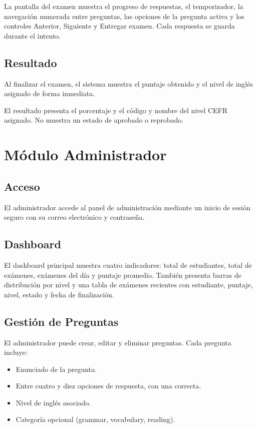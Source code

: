 La pantalla del examen muestra el progreso de respuestas, el temporizador, la navegación numerada entre preguntas, las opciones de la pregunta activa y los controles Anterior, Siguiente y Entregar examen. Cada respuesta se guarda durante el intento.

\subsection{Resultado}

Al finalizar el examen, el sistema muestra el puntaje obtenido y el nivel de inglés asignado de forma inmediata.

El resultado presenta el porcentaje y el código y nombre del nivel CEFR asignado. No muestra un estado de aprobado o reprobado.

\section{Módulo Administrador}

\subsection{Acceso}

El administrador accede al panel de administración mediante un inicio de sesión seguro con su correo electrónico y contraseña.

\subsection{Dashboard}

El dashboard principal muestra cuatro indicadores: total de estudiantes, total de exámenes, exámenes del día y puntaje promedio. También presenta barras de distribución por nivel y una tabla de exámenes recientes con estudiante, puntaje, nivel, estado y fecha de finalización.

\subsection{Gestión de Preguntas}

El administrador puede crear, editar y eliminar preguntas. Cada pregunta incluye:

\begin{itemize}
    \item Enunciado de la pregunta.
    \item Entre cuatro y diez opciones de respuesta, con una correcta.
    \item Nivel de inglés asociado.
    \item Categoría opcional (grammar, vocabulary, reading).
\end{itemize}

